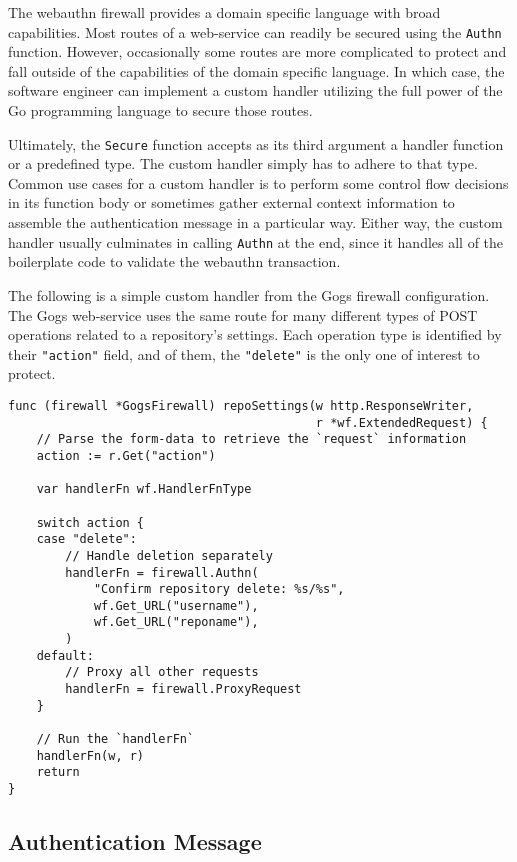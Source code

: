 The webauthn firewall provides a domain specific language with broad capabilities. Most routes of a web-service can readily be secured using the \lstinline{Authn} function. However, occasionally some routes are more complicated to protect and fall outside of the capabilities of the domain specific language. In which case, the software engineer can implement a custom handler utilizing the full power of the Go programming language to secure those routes.

Ultimately, the \lstinline{Secure} function accepts as its third argument a handler function or a predefined type. The custom handler simply has to adhere to that type. Common use cases for a custom handler is to perform some control flow decisions in its function body or sometimes gather external context information to assemble the authentication message in a particular way. Either way, the custom handler usually culminates in calling \lstinline{Authn} at the end, since it handles all of the boilerplate code to validate the webauthn transaction.

The following is a simple custom handler from the Gogs firewall configuration. The Gogs web-service uses the same route for many different types of POST operations related to a repository's settings. Each operation type is identified by their \lstinline{"action"} field, and of them, the \lstinline{"delete"} is the only one of interest to protect.

\begin{lstlisting}
func (firewall *GogsFirewall) repoSettings(w http.ResponseWriter, 
                                           r *wf.ExtendedRequest) {
	// Parse the form-data to retrieve the `request` information
	action := r.Get("action")

	var handlerFn wf.HandlerFnType

	switch action {
	case "delete":
		// Handle deletion separately
		handlerFn = firewall.Authn(
			"Confirm repository delete: %s/%s",
			wf.Get_URL("username"),
			wf.Get_URL("reponame"),
		)
	default:
		// Proxy all other requests
		handlerFn = firewall.ProxyRequest
	}

	// Run the `handlerFn`
	handlerFn(w, r)
	return
}
\end{lstlisting}

\subsection{Authentication Message}\label{Sec:AuthenticationMessage}

